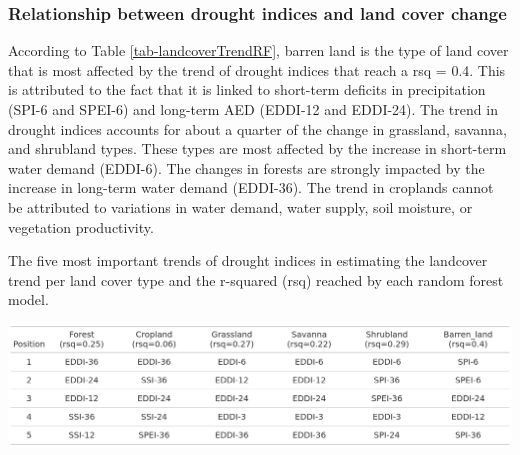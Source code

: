 \documentclass[
  authoryear,
  preprint,
  3p,
  onecolumn]{elsarticle}
\begin{document}
\hypertarget{relationship-between-drought-indices-and-land-cover-change}{%
\subsubsection{Relationship between drought indices and land cover
change}\label{relationship-between-drought-indices-and-land-cover-change}}

According to Table \ref{tab-landcoverTrendRF}, barren land is the type
of land cover that is most affected by the trend of drought indices that
reach a rsq = 0.4. This is attributed to the fact that it is linked to
short-term deficits in precipitation (SPI-6 and SPEI-6) and long-term
AED (EDDI-12 and EDDI-24). The trend in drought indices accounts for
about a quarter of the change in grassland, savanna, and shrubland
types. These types are most affected by the increase in short-term water
demand (EDDI-6). The changes in forests are strongly impacted by the
increase in long-term water demand (EDDI-36). The trend in croplands
cannot be attributed to variations in water demand, water supply, soil
moisture, or vegetation productivity.

\begin{table}[!ht]
\caption{The five most important trends of drought indices in estimating the landcover trend per land cover type and the r-squared (rsq) reached by each random forest model.}
\label{tab-landcoverTrendRF}
\includegraphics[]{../output/figs/table_importance_trends_landcover_vs_drought.png}
\end{table}
\end{document}

